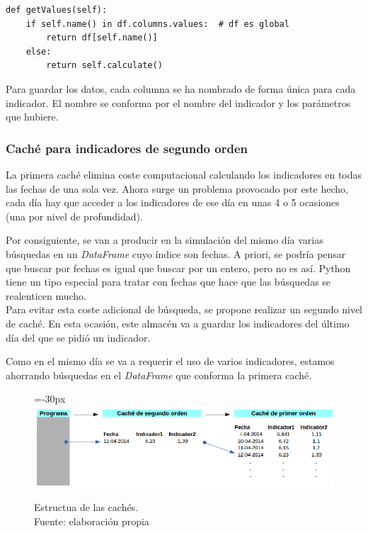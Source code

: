 \begin{lstlisting}
def getValues(self):
	if self.name() in df.columns.values:  # df es global
		return df[self.name()]
	else:
		return self.calculate()
\end{lstlisting}

Para guardar los datos, cada columna se ha nombrado de forma \'unica para cada indicador. El nombre se conforma por el nombre del indicador y los par\'ametros que hubiere.

\subsubsection{Cach\'e para indicadores de segundo orden}

La primera cach\'e elimina coste computacional calculando los indicadores en todas las fechas de una sola vez. Ahora surge un problema provocado por este hecho, cada d\'ia hay que acceder a los indicadores de ese d\'ia en unas 4 o 5 ocasiones (una por nivel de profundidad).

Por consiguiente, se van a producir en la simulaci\'on del mismo d\'ia varias b\'usquedas en un \textit{DataFrame} cuyo \'indice son fechas. A priori, se podr\'ia pensar que buscar por fechas es igual que buscar por un entero, pero no es as\'i. Python tiene un tipo especial para tratar con fechas que hace que las b\'usquedas se realenticen mucho.\\

Para evitar esta coste adicional de b\'usqueda, se propone realizar un segundo nivel de cach\'e. En esta ocasi\'on, este almac\'en va a guardar los indicadores del \'ultimo d\'ia del que se pidi\'o un indicador. 

Como en el mismo d\'ia se va a requerir el uso de varios indicadores, estamos ahorrando b\'usquedas en el \textit{DataFrame} que conforma la primera cach\'e.

     	\begin{figure}[H]
    		\centering\leftskip=-30px
    		\includegraphics[scale=0.60]{imagenes/caches.png}
    	    \caption[Estructura de las cach\'es]{Estructua de las cach\'es.\\ Fuente: elaboraci\'on propia}
    		\label{fig:caches}
	   \end{figure}
	   
